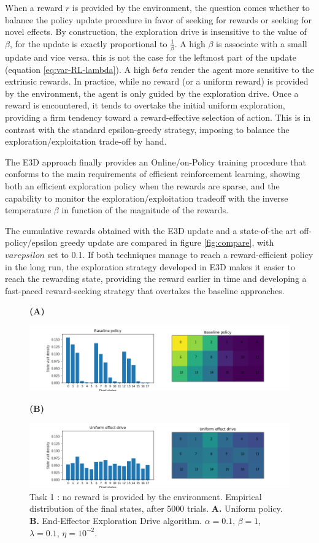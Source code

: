 \documentclass[runningheads]{llncs}
\begin{document}
When a reward $r$ is provided by the environment, the question comes whether to balance the policy update procedure in favor of seeking for rewards or seeking for novel effects. By construction, the exploration drive is insensitive to the value of $\beta$, for the update is exactly proportional to $\frac{1}{\beta}$.  A high $\beta$ is associate with a small update and vice versa. this is not the case for the leftmost part of the update (equation \ref{eq:var-RL-lambda}). A high $beta$ render the agent more sensitive to the extrinsic rewards. In practice, while no reward (or a uniform reward) is provided by the environment, the agent is only guided by the exploration drive. Once a reward is encountered, it tends to overtake the initial uniform exploration, providing a firm tendency toward a reward-effective selection of action. This is in contrast with the standard epsilon-greedy strategy, imposing to balance the exploration/exploitation trade-off by hand.

The E3D approach finally provides an Online/on-Policy training procedure that conforms to the main requirements of efficient reinforcement learning, showing both an efficient exploration policy when the rewards are sparse, and the capability to monitor the exploration/exploitation tradeoff with the inverse temperature $\beta$ in function of the magnitude of the rewards.

The cumulative rewards obtained with the E3D update and a state-of-the art off-policy/epsilon greedy update are compared in figure \ref{fig:compare}, with $varepsilon$ set to 0.1. If both techniques manage to reach a reward-efficient policy in the long run, the exploration strategy developed in E3D makes it easier to reach the rewarding state, providing the reward earlier in time and developing a fast-paced reward-seeking strategy that overtakes the baseline approaches.    

\begin{figure}[t!]\label{fig:explore}
	\centerline{\bf (A)}
	\centerline{
		\includegraphics[width = .9\linewidth]{../figures/botteneck-baseline.png} 		
	}
	\centerline{\bf (B)}
	\centerline{\includegraphics[width = .9\linewidth]{../figures/botteneck-uniform-drive.png} }
	\caption{Task 1 : no reward is provided by the environment. Empirical distribution of the final states, after 5000 trials. {\bf A.} Uniform policy. {\bf B.} End-Effector Exploration Drive algorithm. $\alpha=0.1$, $\beta = 1$, $\lambda=0.1$, $\eta=10^{-2}$.}
\end{figure}
\end{document}

